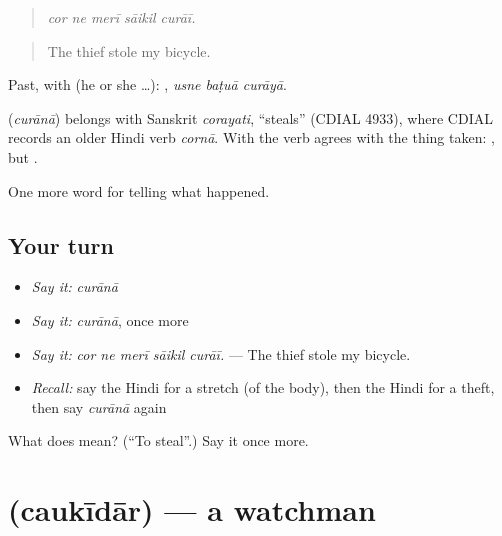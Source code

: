 \begin{quote}
    
\end{quote}

\begin{quote}
\emph{cor ne merī sāikil curāī.}
\end{quote}

\begin{quote}
The thief stole my bicycle.
\end{quote}

Past, with  (he or she …):   , \emph{usne baṭuā curāyā}.

\begin{cousinweb}
\textbf{} (\emph{curānā}) belongs with Sanskrit \emph{corayati}, \textquotedblleft{}steals\textquotedblright{} (CDIAL 4933), where CDIAL records an older Hindi verb \emph{cornā}. With \textbf{} the verb agrees with the thing taken: \textbf{ }, but \textbf{ }.
\end{cousinweb}

\begin{grammarlens}[title={What you've built}]
One more word for telling what happened.
\end{grammarlens}

\subsection*{Your turn}
\begin{itemize}
\raggedright
  \item \emph{Say it:} \emph{curānā}
  \item \emph{Say it:} \emph{curānā}, once more
  \item \emph{Say it:} \emph{cor ne merī sāikil curāī.} — The thief stole my bicycle.
  \item \emph{Recall:} say the Hindi for a stretch (of the body), then the Hindi for a theft, then say \emph{curānā} again
\end{itemize}

\begin{tcolorbox}[breakable,colback=teal!4,colframe=teal!35!black,title={Before you move on}]
What does  mean? (\textquotedblleft{}To steal\textquotedblright{}.) Say it once more.
\end{tcolorbox}
\section[\texorpdfstring{\hi{चौकीदार} (caukīdār)}{चौकीदार (caukīdār)}]{ (caukīdār) — a watchman}

